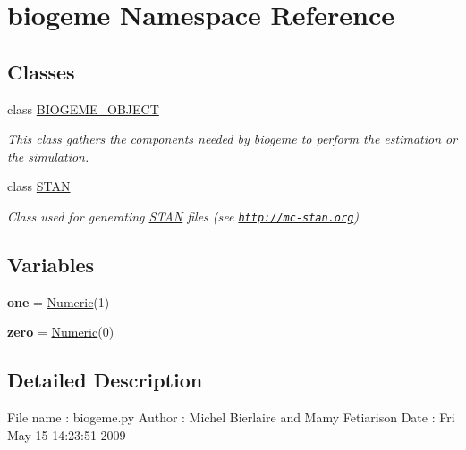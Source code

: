 \hypertarget{namespacebiogeme}{}\section{biogeme Namespace Reference}
\label{namespacebiogeme}
\subsection*{Classes}
\begin{DoxyCompactItemize}
\item 
class \hyperlink{classbiogeme_1_1_b_i_o_g_e_m_e___o_b_j_e_c_t}{B\+I\+O\+G\+E\+M\+E\+\_\+\+O\+B\+J\+E\+CT}
\begin{DoxyCompactList}\small\item\em This class gathers the components needed by biogeme to perform the estimation or the simulation. \end{DoxyCompactList}\item 
class \hyperlink{classbiogeme_1_1_s_t_a_n}{S\+T\+AN}
\begin{DoxyCompactList}\small\item\em Class used for generating \hyperlink{classbiogeme_1_1_s_t_a_n}{S\+T\+AN} files (see \href{http://mc-stan.org}{\tt http\+://mc-\/stan.\+org}) \end{DoxyCompactList}\end{DoxyCompactItemize}
\subsection*{Variables}
\begin{DoxyCompactItemize}
\item 
{\bfseries one} = \hyperlink{classbio__expression_1_1_numeric}{Numeric}(1)\hypertarget{namespacebiogeme_a4aa5180b662d1583f739d042bc5e6ff3}{}\label{namespacebiogeme_a4aa5180b662d1583f739d042bc5e6ff3}

\item 
{\bfseries zero} = \hyperlink{classbio__expression_1_1_numeric}{Numeric}(0)\hypertarget{namespacebiogeme_a03ee63258eb18b8c1d0b2c974d6ed4b7}{}\label{namespacebiogeme_a03ee63258eb18b8c1d0b2c974d6ed4b7}

\end{DoxyCompactItemize}


\subsection{Detailed Description}
\begin{DoxyVerb}File name : biogeme.py
Author :    Michel Bierlaire and Mamy Fetiarison
Date :      Fri May 15 14:23:51 2009
\end{DoxyVerb}
 